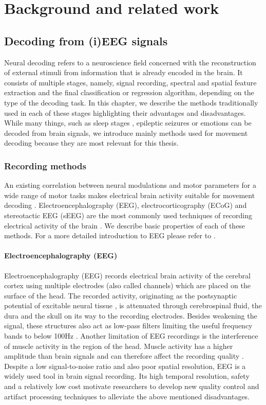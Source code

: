 \chapter{Background and related work}
\label{chap:background}
\section{Decoding from (i)EEG signals}
Neural decoding refers to a neuroscience field concerned with the reconstruction of external stimuli from information that is already encoded in the brain.
It consists of multiple stages, namely, signal recording, spectral and spatial feature extraction and the final classification or regression algorithm, depending on the type of the decoding task. 
In this chapter, we describe the methods traditionally used in each of these stages highlighting their advantages and disadvantages. 
While many things, such as sleep stages \cite{sleep-eegnet}, epileptic seizures \cite{epileptic-seizures-eeg} or emotions \cite{} can be decoded from brain signals, we introduce mainly methods used for movement decoding because they are most relevant for this thesis. 

\subsection{Recording methods}
An existing correlation between neural modulations and motor parameters for a wide range of motor tasks makes electrical brain activity suitable for movement decoding  \cite{lebedev-cortical-2005}.
Electroencephalography (EEG), electrocorticography (ECoG) and stereotactic EEG (sEEG) are the most commonly used techniques of recording electrical activity of the brain \cite{tam-human-2019}.
We describe basic properties of each of these methods. For a more detailed introduction to EEG please refer to \cite{NiedermeyersElectroencephalography}.

\subsubsection{Electroencephalography (EEG)}
Electroencephalography (EEG) records electrical brain activity of the cerebral cortex using multiple electrodes (also called channels) which are placed on the surface of the head. The recorded activity, originating as the postsynaptic potential of excitable neural tissue \cite{buzsaki-origin-2012}, is attenuated through cerebrospinal fluid, the dura and the skull on its way to the recording electrodes. Besides weakening the signal, these structures also act as low-pass filters limiting the useful frequency bands to below 100Hz \cite{tam-human-2019}. Another limitation of EEG recordings is the interference of muscle activity in the region of the head. Muscle activity has a higher amplitude than brain signals and can therefore affect the recording quality \cite{scholg-presence-2002}. Despite a low signal-to-noise ratio and also poor spatial resolution, EEG is a widely used tool in brain signal recording. Its high temporal resolution, safety and a relatively low cost motivate researchers to develop new quality control and artifact processing techniques \cite{} to alleviate the above mentioned disadvantages. 

